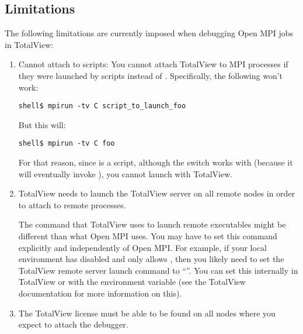 
\subsection{Limitations}

The following limitations are currently imposed when debugging Open MPI
jobs in TotalView:

\begin{enumerate}
\item Cannot attach to scripts: You cannot attach TotalView to MPI
  processes if they were launched by scripts instead of .
  Specifically, the following won't work:
                
  \lstset{style=ompi-cmdline}
  \begin{lstlisting}
shell$ mpirun -tv C script_to_launch_foo
  \end{lstlisting}

  But this will:

  \lstset{style=ompi-cmdline}
  \begin{lstlisting}
shell$ mpirun -tv C foo
  \end{lstlisting}
  
  For that reason, since  is a script, although the
   switch works with  (because it will
  eventually invoke ), you cannot launch 
  with TotalView.
  
\item TotalView needs to launch the TotalView server on all remote
  nodes in order to attach to remote processes.  
  
  The command that TotalView uses to launch remote executables might
  be different than what Open MPI uses.  You may have to set this
  command explicitly and independently of Open MPI.
%
  For example, if your local environment has  disabled and
  only allows , then you likely need to set the TotalView
  remote server launch command to ``''.  You can set this
  internally in TotalView or with the 
  environment variable (see the TotalView documentation for more
  information on this).
  
\item The TotalView license must be able to be found on all nodes
  where you expect to attach the debugger.  
  

\end{enumerate}

